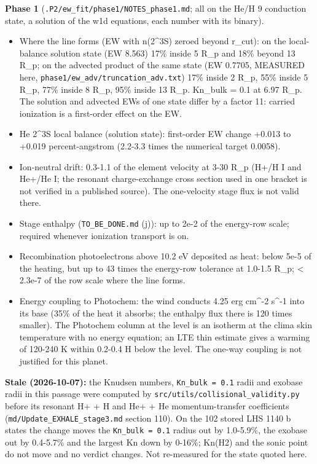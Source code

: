 \documentclass[english,a4paper]{my_memo}
\providecommand{\tightlist}{\setlength{\itemsep}{0pt}\setlength{\parskip}{0pt}}
\begin{document}
\textbf{Phase 1} (\texttt{.P2/ew\_fit/phase1/NOTES\_phase1.md}; all on the He/H 9
conduction state, a solution of the w1d equations, each number with its
binary).

\begin{itemize}
\tightlist
\item
  Where the line forms (EW with n(2\^{}3S) zeroed beyond r\_cut): on the
  local-balance solution state (EW 8.563) 17\% inside 5 R\_p and 18\% beyond
  13 R\_p; on the advected product of the same state (EW 0.7705, MEASURED
  here, \texttt{phase1/ew\_adv/truncation\_adv.txt}) 17\% inside 2 R\_p, 55\% inside
  5 R\_p, 77\% inside 8 R\_p, 95\% inside 13 R\_p. Kn\_bulk = 0.1 at 6.97 R\_p.
  The solution and advected EWs of one state differ by a factor 11: carried
  ionization is a first-order effect on the EW.
\item
  He 2\^{}3S local balance (solution state): first-order EW change +0.013 to
  +0.019 percent-angstrom (2.2-3.3 times the numerical target 0.0058).
\item
  Ion-neutral drift: 0.3-1.1 of the element velocity at 3-30 R\_p (H+/H I
  and He+/He I; the resonant charge-exchange cross section used in one
  bracket is not verified in a published source). The one-velocity stage
  flux is not valid there.
\item
  Stage enthalpy (\texttt{TO\_BE\_DONE.md} (j)): up to 2e-2 of the energy-row scale;
  required whenever ionization transport is on.
\item
  Recombination photoelectrons above 10.2 eV deposited as heat: below 5e-5
  of the heating, but up to 43 times the energy-row tolerance at 1.0-1.5
  R\_p; \textless{} 2.3e-7 of the row scale where the line forms.
\item
  Energy coupling to Photochem: the wind conducts 4.25 erg cm\^{}-2 s\^{}-1 into
  its base (35\% of the heat it absorbs; the enthalpy flux there is 120 times
  smaller). The Photochem column at the level is an isotherm at the clima
  skin temperature with no energy equation; an LTE thin estimate gives a
  warming of 120-240 K within 0.2-0.4 H below the level. The one-way
  coupling is not justified for this planet.
\end{itemize}

\textbf{Stale (2026-10-07):} the Knudsen numbers, \texttt{Kn\_bulk\ =\ 0.1} radii and exobase radii in this passage were computed by \texttt{src/utils/collisional\_validity.py} before its resonant H+ + H and He+ + He momentum-transfer coefficients (\texttt{md/Update\_EXHALE\_stage3.md} section 110). On the 102 stored LHS 1140 b states the change moves the \texttt{Kn\_bulk\ =\ 0.1} radius out by 1.0-5.9\%, the exobase out by 0.4-5.7\% and the largest Kn down by 0-16\%; Kn(H2) and the sonic point do not move and no verdict changes. Not re-measured for the state quoted here.
\end{document}
